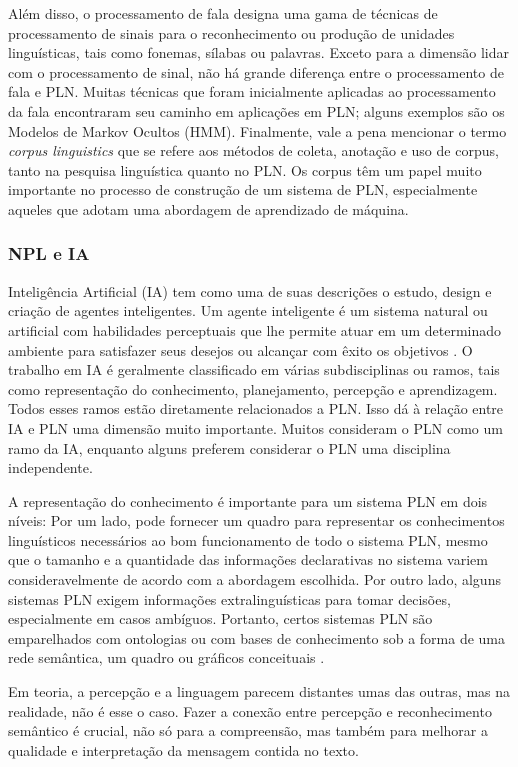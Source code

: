 \documentclass[
	12pt,				%
	openright,			%
	oneside,			%
	a4paper,			%
	english,			%
	spanish,			%
	brazil				%
	]{abntex2}
\begin{document}
Além disso, o processamento de fala designa uma gama de técnicas de processamento de sinais para o reconhecimento ou produção de unidades linguísticas, tais como fonemas, sílabas ou palavras. Exceto para a dimensão lidar com o processamento de sinal, não há grande diferença entre o processamento de fala e PLN. Muitas técnicas que foram inicialmente aplicadas ao processamento da fala encontraram seu caminho em aplicações em PLN; alguns exemplos são os Modelos de Markov Ocultos (HMM). Finalmente, vale a pena mencionar o termo \textit{corpus linguistics}  que se refere aos métodos de coleta, anotação e uso de corpus, tanto na pesquisa linguística quanto no PLN. Os corpus têm um papel muito importante no processo de construção de um sistema de PLN, especialmente aqueles que adotam uma abordagem de aprendizado de máquina.

	\subsubsection*{NPL e IA}
	Inteligência Artificial (IA) tem como uma de suas descrições o estudo, design e criação de agentes inteligentes. Um agente inteligente é um sistema natural ou artificial com habilidades perceptuais que lhe permite atuar em um determinado ambiente para satisfazer seus desejos ou alcançar com êxito os objetivos \cite{norvig3rd}. O trabalho em IA é geralmente classificado em várias subdisciplinas ou ramos, tais como representação do conhecimento, planejamento, percepção e aprendizagem. Todos esses ramos estão diretamente relacionados a PLN. Isso dá à relação entre IA e PLN uma dimensão muito importante. Muitos consideram o PLN como um ramo da IA, enquanto alguns preferem considerar o PLN uma disciplina independente. 

	
A representação do conhecimento é importante para um sistema PLN em dois níveis: Por um lado, pode fornecer um quadro para representar os conhecimentos linguísticos necessários ao bom funcionamento de todo o sistema PLN, mesmo que o tamanho e a quantidade das informações declarativas no sistema variem consideravelmente de acordo com a abordagem escolhida. Por outro lado, alguns sistemas PLN exigem informações extralinguísticas para tomar decisões, especialmente em casos ambíguos. Portanto, certos sistemas PLN são emparelhados com ontologias ou com bases de conhecimento sob a forma de uma rede semântica, um quadro ou gráficos conceituais \cite{book_natural_lang}.

Em teoria, a percepção e a linguagem parecem distantes umas das outras, mas na realidade, não é esse o caso. Fazer a conexão entre percepção e reconhecimento semântico é crucial, não só para a compreensão, mas também para melhorar a qualidade e interpretação da mensagem contida no texto. 
\end{document}
